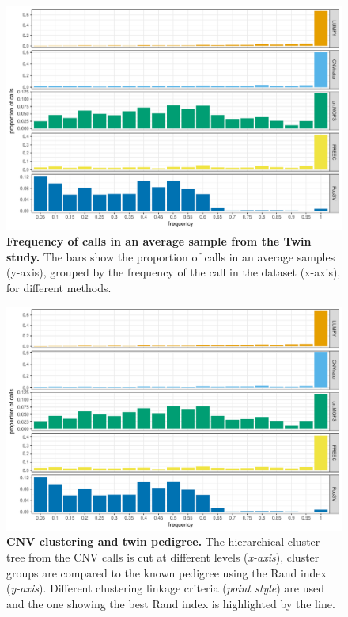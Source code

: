 \begin{figure}[htp]
  \centering
  \includegraphics[width=\linewidth, page=1]{figures/twin-benchmark.pdf}
  \caption[Frequency of calls in an average sample from the Twin study.]{{\bf Frequency of calls in an average sample from the Twin study.} {\small The bars show the proportion of calls in an average samples (y-axis), grouped by the frequency of the call in the dataset (x-axis), for different methods.}}
  \label{fig:freqmeth}
\end{figure}

\begin{figure}[htp]
  \centering
  \includegraphics[width=.8\linewidth, page=2]{figures/twin-benchmark.pdf}
  \caption[CNV clustering and twin pedigree.]{{\bf CNV clustering and twin pedigree.} {\small The hierarchical cluster tree from the CNV calls is cut at different levels ({\it x-axis}), cluster groups are compared to the known pedigree using the Rand index ({\it y-axis}). Different clustering linkage criteria ({\it point style}) are used and the one showing the best Rand index is highlighted by the line.}}
  \label{fig:twinclust}
\end{figure}

